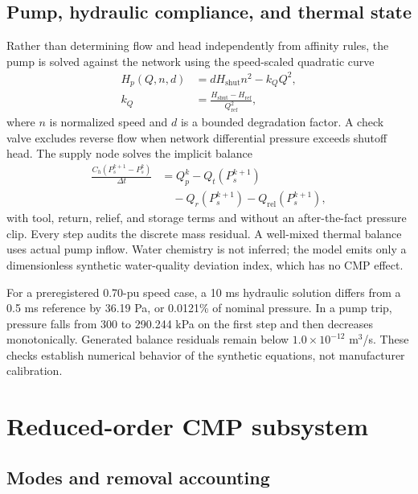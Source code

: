 \documentclass[10pt,twocolumn]{article}
\begin{document}
\subsection{Pump, hydraulic compliance, and thermal state}

Rather than determining flow and head independently from affinity rules, the
pump is solved against the network using the speed-scaled quadratic curve
\begin{equation}
\begin{aligned}
 H_p(Q,n,d)&=dH_{\mathrm{shut}}n^2-k_QQ^2,\\
 k_Q&=\frac{H_{\mathrm{shut}}-H_{\mathrm{ref}}}
 {Q_{\mathrm{ref}}^2},
\end{aligned}
 \label{eq:pump-curve}
\end{equation}
where $n$ is normalized speed and $d$ is a bounded degradation factor. A check
valve excludes reverse flow when network differential pressure exceeds shutoff
head. The supply node solves the implicit balance
\begin{equation}
\begin{aligned}
 \frac{C_h(P_s^{k+1}-P_s^k)}{\Delta t}
 &=Q_p^k-Q_t(P_s^{k+1})\\
 &\quad-Q_r(P_s^{k+1})-Q_{\mathrm{rel}}(P_s^{k+1}),
\end{aligned}
 \label{eq:hydraulic-balance}
\end{equation}
with tool, return, relief, and storage terms and without an after-the-fact
pressure clip. Every step audits the discrete mass residual. A well-mixed
thermal balance uses actual pump inflow. Water chemistry is not inferred; the
model emits only a dimensionless synthetic water-quality deviation index,
which has no CMP effect.

For a preregistered 0.70-pu speed case, a 10 ms hydraulic solution differs
from a 0.5 ms reference by 36.19 Pa, or 0.0121\% of nominal pressure. In a pump
trip, pressure falls from 300 to 290.244 kPa on the first step and then
decreases monotonically. Generated balance residuals remain below
$1.0\times10^{-12}$ m$^3$/s. These checks establish numerical behavior of the
synthetic equations, not manufacturer calibration.

\section{Reduced-order CMP subsystem}

\subsection{Modes and removal accounting}
\end{document}
